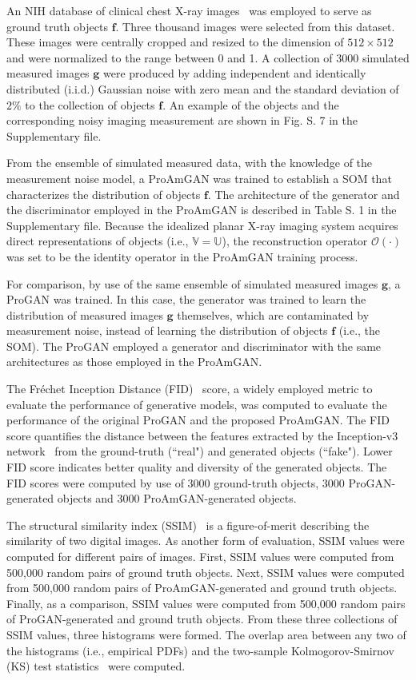 \documentclass[journal]{IEEEtran}
\renewcommand{\vec}[1]{\mathbf{#1}}
\begin{document}
An NIH database of clinical chest X-ray images~\cite{wang2017chestx} was employed 
to serve as ground truth objects $\vec{f}$.
Three thousand images were selected from this dataset.
These images  
were centrally cropped and resized to the dimension of $512\times 512$
and were normalized to the range between 0 and 1.
A collection of 3000 simulated measured images $\vec{g}$ were produced
by adding independent and identically distributed (i.i.d.) Gaussian noise with zero mean and the standard deviation of $2\%$ to the
collection of objects  $\mathbf{f}$.
An example of the objects and  the corresponding noisy imaging measurement are
 shown in Fig. S. 7 in the Supplementary file.

From the ensemble of simulated measured data, with the knowledge of the measurement noise model, a ProAmGAN was trained to establish a SOM
that characterizes the  distribution of objects $\mathbf{f}$. The architecture of the generator and the discriminator employed in the ProAmGAN is described in Table S. 1 in the Supplementary file. {Because the idealized planar X-ray imaging system acquires direct representations of objects (i.e., $\mathbb{V}=\mathbb{U}$), the reconstruction operator $\mathcal{O}(\cdot)$ was set to be the identity operator in the ProAmGAN training process.}

{For comparison, by use of the same ensemble of simulated measured images $\mathbf{g}$, a ProGAN was trained.
In this case, the generator was trained to learn the distribution of measured images $\mathbf{g}$ 
themselves, which  are contaminated by measurement noise,  instead of learning 
the distribution of objects $\mathbf{f}$ (i.e., the SOM).
 The ProGAN employed a generator and discriminator with the same architectures as those employed in the ProAmGAN.}
 
The Fr\'{e}chet Inception Distance (FID)~\cite{heusel2017gans} score, 
a widely employed metric to evaluate the performance of generative models, 
was computed to evaluate the performance of the original ProGAN and the proposed ProAmGAN. 
The FID score quantifies the distance between the features extracted by the Inception-v3 network~\cite{szegedy2016rethinking} from the ground-truth (``real") and generated objects (``fake"). 
Lower FID score indicates better quality and diversity of the generated objects. 
The FID scores were computed by use of 3000 ground-truth objects, 3000 ProGAN-generated objects and 3000 ProAmGAN-generated objects.


The structural similarity index (SSIM)~\cite{wang2004image} is a figure-of-merit describing the similarity of two digital images.
As another form of evaluation, SSIM values were computed for different pairs of images.
First, 
SSIM values were computed from 500,000 random pairs of ground truth objects.
Next,  SSIM values were computed
from 500,000 random pairs of
 ProAmGAN-generated and ground truth objects.
Finally, as a comparison, 
SSIM values were computed
from 500,000 random pairs of
 ProGAN-generated and ground truth objects.
From these three collections of SSIM values, three histograms were formed.
The overlap area between any two of the histograms (i.e., empirical PDFs)
 and the two-sample Kolmogorov-Smirnov (KS) test statistics~\cite{young1977proof} were computed.
\end{document}
